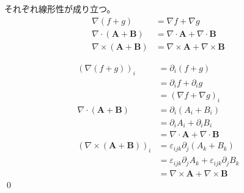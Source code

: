 \documentclass[uplatex,dvipdfmx,a4paper,11pt]{jlreq}
\makeatletter
\newcommand{\grad}{\nabla}
\renewcommand{\div}{\nabla\cdot}
\newcommand{\rot}{\nabla\times}
\theoremstyle{definition}
\renewenvironment{proof}[1][\proofname]{\par
  \normalfont
  \topsep6\p@\@plus6\p@ \trivlist
  \item[\hskip\labelsep{\bfseries #1}\@addpunct{\bfseries}]\ignorespaces\quad\par
}{%
  \qed\endtrivlist\@endpefalse
}
\renewcommand\proofname{証明}
\makeatother
\begin{document}
\begin{theorem}[勾配・発散・回転の線形性]
  それぞれ線形性が成り立つ。
  \begin{align}
    \grad{(f+g)}          & = \grad{f} + \grad{g}         \\
    \div{(\bm{A}+\bm{B})} & = \div{\bm{A}} + \div{\bm{B}} \\
    \rot{(\bm{A}+\bm{B})} & = \rot{\bm{A}} + \rot{\bm{B}}
  \end{align}
\end{theorem}
\begin{proof}
  \begin{align}
    (\grad{(f+g)})_i            & = \partial_i(f+g)                                                 \\
                                & = \partial_i f + \partial_i g                                     \\
                                & = (\grad{f} + \grad{g})_i                                         \\
    \div{(\bm{A}+\bm{B})}       & = \partial_i(A_i + B_i)                                           \\
                                & = \partial_i A_i + \partial_i B_i                                 \\
                                & = \div{\bm{A}}+\div{\bm{B}}                                       \\
    (\rot{(\bm{A} + \bm{B})})_i & = \varepsilon_{ijk}\partial_j(A_k + B_k)                          \\
                                & = \varepsilon_{ijk}\partial_jA_k + \varepsilon_{ijk}\partial_jB_k \\
                                & = \rot{\bm{A}} + \rot{\bm{B}}
  \end{align}
\end{proof}
\end{document}
